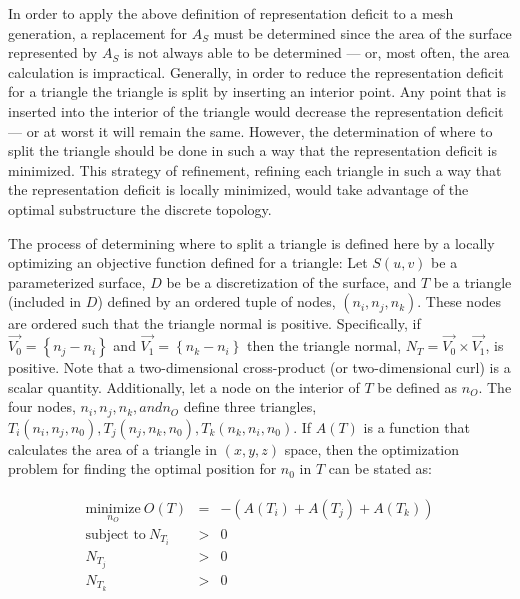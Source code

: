\documentclass[11pt]{article}
\begin{document}
In order to apply the above definition of representation deficit to a
mesh generation, a replacement for $A_S$ must be determined since the
area of the surface represented by $A_S$ is not always able to be
determined --- or, most often, the area calculation is impractical.
Generally, in order to reduce the representation deficit for a triangle
the triangle is split by inserting an interior point. Any point that is
inserted into the interior of the triangle would decrease the
representation deficit --- or at worst it will remain the same. However,
the determination of where to split the triangle should be done in such
a way that the representation deficit is minimized. This strategy of
refinement, refining each triangle in such a way that the representation
deficit is locally minimized,  would take advantage of the optimal
substructure the discrete topology.

The process of determining where to split a triangle is defined here by
a locally optimizing an objective function defined for a triangle: Let
$S(u,v)$ be a parameterized surface, $D$ be be a discretization of the
surface, and $T$ be a triangle (included in $D$) defined by an ordered
tuple of nodes, $\left(n_i, n_j, n_k\right)$. These nodes are ordered
such that the triangle normal is positive. Specifically, if $\vec{V_0} =
\left\{n_j - n_i \right\}$ and $\vec{V_1} = \left\{n_k - n_i\right\}$
then the triangle normal, $N_T = \vec{V_0} \times \vec{V_1}$, is
positive. Note that a two-dimensional cross-product (or two-dimensional
curl) is a scalar quantity. Additionally, let a node on the interior of
$T$ be defined as $n_O$. The four nodes, $n_i, n_j, n_k, and n_O$ define
three triangles, $T_i\left(n_i,n_j,n_0\right), T_j\left(n_j, n_k,
n_0\right), T_k\left(n_k, n_i, n_0\right)$. If $A(T)$ is a function that
calculates the area of a triangle in $\left(x,y,z\right)$ space, then
the optimization problem for finding the optimal position for $n_0$ in
$T$ can be stated as:

\begin{eqnarray*}
\begin{array}{rcl}
\underset{n_O}{\text{minimize}} \ O(T) & = & -\left(A\left(T_i\right) + A\left(T_j\right) + A\left(T_k\right) \right) \\
\text{subject to} \ N_{T_i} & > & 0 \\
N_{T_j} & > & 0 \\ 
N_{T_k} & > & 0 \\
\end{array}
\end{eqnarray*}
\end{document}
